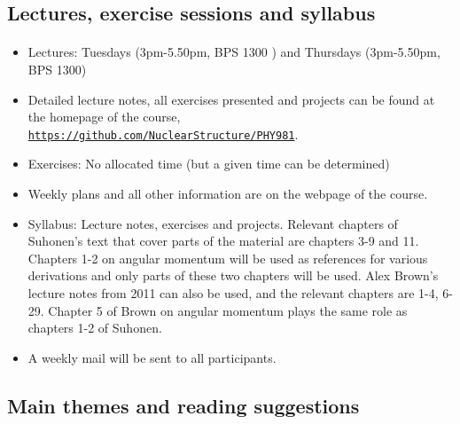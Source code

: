 \documentclass[%
twoside,                 %
final,                   %
10pt]{article}
\begin{document}
\subsection{Lectures, exercise sessions and syllabus}

\paragraph{}
\begin{itemize}
\item Lectures: Tuesdays (3pm-5.50pm, BPS 1300 ) and Thursdays (3pm-5.50pm, BPS 1300)

\item Detailed lecture notes, all exercises presented and projects can be found at the homepage of the course, \href{{https://github.com/NuclearStructure/PHY981}}{\nolinkurl{https://github.com/NuclearStructure/PHY981}}.

\item Exercises: No allocated time (but a given time can be determined)

\item Weekly plans and all other information are on the webpage of the course.

\item Syllabus: Lecture notes, exercises and projects. Relevant chapters of Suhonen's text that cover parts of the material are chapters 3-9 and 11. Chapters 1-2 on angular momentum will be used as references for various derivations and only parts of these two chapters will be used. Alex Brown's lecture notes from 2011 can also be used, and the relevant chapters are 1-4, 6-29. Chapter 5 of Brown on angular momentum plays the same role as chapters 1-2 of Suhonen. 

\item A weekly mail will be sent to all participants. 
\end{itemize}

\noindent




\subsection{Main themes and reading suggestions}

\end{document}
